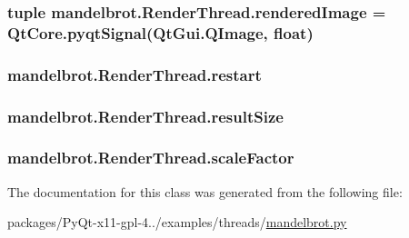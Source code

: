 \subsubsection[{rendered\+Image}]{\setlength{\rightskip}{0pt plus 5cm}tuple mandelbrot.\+Render\+Thread.\+rendered\+Image = Qt\+Core.\+pyqt\+Signal(Qt\+Gui.\+Q\+Image, float)\hspace{0.3cm}{\ttfamily [static]}}\label{classmandelbrot_1_1RenderThread_aa91f2aedf998232df81073d6f6e55d4d}
\hypertarget{classmandelbrot_1_1RenderThread_a0f46a2340aab9e04593e8a6f882a02b1}{}
\subsubsection[{restart}]{\setlength{\rightskip}{0pt plus 5cm}mandelbrot.\+Render\+Thread.\+restart}\label{classmandelbrot_1_1RenderThread_a0f46a2340aab9e04593e8a6f882a02b1}
\hypertarget{classmandelbrot_1_1RenderThread_a663e6420fadb40b7c820b9e8087e95a6}{}
\subsubsection[{result\+Size}]{\setlength{\rightskip}{0pt plus 5cm}mandelbrot.\+Render\+Thread.\+result\+Size}\label{classmandelbrot_1_1RenderThread_a663e6420fadb40b7c820b9e8087e95a6}
\hypertarget{classmandelbrot_1_1RenderThread_a1ed90d726ea886b5b9c6c5fd58eece84}{}
\subsubsection[{scale\+Factor}]{\setlength{\rightskip}{0pt plus 5cm}mandelbrot.\+Render\+Thread.\+scale\+Factor}\label{classmandelbrot_1_1RenderThread_a1ed90d726ea886b5b9c6c5fd58eece84}


The documentation for this class was generated from the following file\+:\begin{DoxyCompactItemize}
\item 
packages/\+Py\+Qt-\/x11-\/gpl-\/4../examples/threads/\hyperlink{mandelbrot_8py}{mandelbrot.\+py}\end{DoxyCompactItemize}
